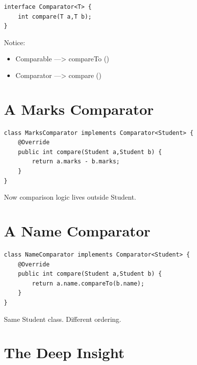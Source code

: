 \documentclass[11pt,a4paper]{book}
\begin{document}
\begin{verbatim} 
interface Comparator<T> {
    int compare(T a,T b);
}
\end{verbatim}


Notice:

\begin{itemize}
\item \textcolor{RosettaJade}{Comparable} ---> \textcolor{RosettaRoyalPurple}{compareTo} ()
\item \textcolor{RosettaJade}{Comparator} ---> \textcolor{RosettaRoyalPurple}{compare} ()
\end{itemize}

\section{A Marks Comparator}

\begin{verbatim} 
class MarksComparator implements Comparator<Student> {
    @Override
    public int compare(Student a,Student b) {
        return a.marks - b.marks;
    }
}
\end{verbatim}
Now comparison logic
lives outside Student.

\section{A Name Comparator}

\begin{verbatim} 
class NameComparator implements Comparator<Student> {
    @Override
    public int compare(Student a,Student b) {
        return a.name.compareTo(b.name);
    }
}
\end{verbatim}

Same Student class.
Different ordering.

\section{The Deep Insight}
\end{document}
